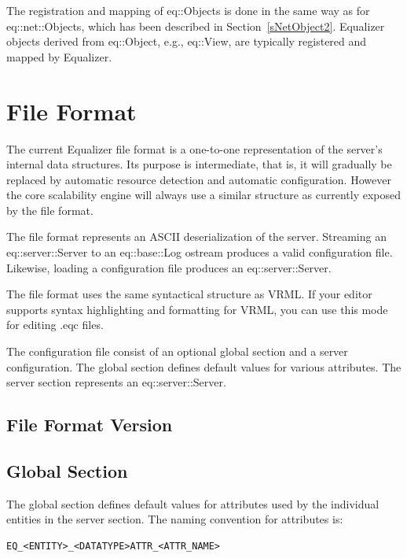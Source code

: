 \documentclass[10pt,a4]{scrartcl}
\newcommand{\sref}[1]{Section~\ref{#1}}
\begin{document}
The registration and mapping of \textsf{eq::Object}s is done in the same
way as for \textsf{eq::net::Object}s, which has been described in
\sref{sNetObject2}. Equalizer objects derived from \textsf{eq::Object},
e.g., \textsf{eq::View}, are typically registered and mapped by
Equalizer.


\newpage
\appendix
\section{\label{aFileFormat}File Format}

The current Equalizer file format is a one-to-one representation of the
server's internal data structures. Its purpose is intermediate, that is,
it will gradually be replaced by automatic resource detection and
automatic configuration. However the core scalability engine will always
use a similar structure as currently exposed by the file format.

The file format represents an ASCII deserialization of the
server. Streaming an \textsf{eq::server::Server} to an \textsf{eq::base::Log}
ostream produces a valid configuration file. Likewise, loading a
configuration file produces an \textsf{eq::server::Server}.

The file format uses the same syntactical structure as VRML. If your
editor supports syntax highlighting and formatting for VRML, you can use
this mode for editing \textsf{.eqc} files.

The configuration file consist of an optional global section and a
server configuration. The global section defines default values for
various attributes. The server section represents an
\textsf{eq::server::Server}.


\subsection{File Format Version}

\subsection{\label{sGlobal}Global Section}

The global section defines default values for attributes used by the
individual entities in the server section. The naming convention for
attributes is:

{\footnotesize\begin{lstlisting}
EQ_<ENTITY>_<DATATYPE>ATTR_<ATTR_NAME>
\end{lstlisting}}
\end{document}

